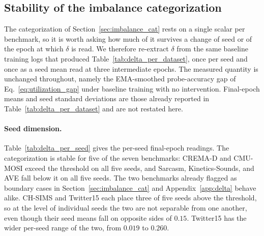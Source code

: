 \documentclass{article}
\begin{document}
\subsection{Stability of the imbalance categorization}
\label{app:delta_stability}

The categorization of Section~\ref{sec:imbalance_cat} rests on a single scalar per benchmark, so it is worth asking how much of it survives a change of seed or of the epoch at which $\delta$ is read. We therefore re-extract $\delta$ from the same baseline training logs that produced Table~\ref{tab:delta_per_dataset}, once per seed and once as a seed mean read at three intermediate epochs. The measured quantity is unchanged throughout, namely the EMA-smoothed probe-accuracy gap of Eq.~\eqref{eq:utilization_gap} under baseline training with no intervention. Final-epoch means and seed standard deviations are those already reported in Table~\ref{tab:delta_per_dataset} and are not restated here.

\paragraph{Seed dimension.} Table~\ref{tab:delta_per_seed} gives the per-seed final-epoch readings. The categorization is stable for five of the seven benchmarks: CREMA-D and CMU-MOSI exceed the threshold on all five seeds, and Sarcasm, Kinetics-Sounds, and AVE fall below it on all five seeds. The two benchmarks already flagged as boundary cases in Section~\ref{sec:imbalance_cat} and Appendix~\ref{app:delta} behave alike. CH-SIMS and Twitter15 each place three of five seeds above the threshold, so at the level of individual seeds the two are not separable from one another, even though their seed means fall on opposite sides of $0.15$. Twitter15 has the wider per-seed range of the two, from $0.019$ to $0.260$.
\end{document}

